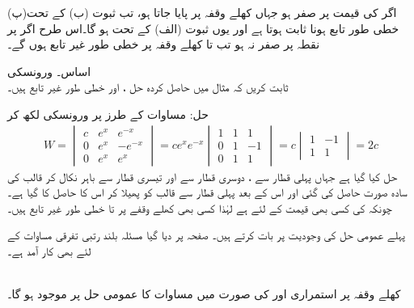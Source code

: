 (پ)\quad اگر  کی قیمت  پر صفر ہو جہاں  کھلے وقفہ  پر پایا جاتا ہو، تب ثبوت (ب) کے تحت خطی طور تابع ہونا ثابت ہوتا ہے اور یوں ثبوت (الف) کے تحت  ہو گا۔اس طرح اگر  پر نقطہ  پر  صفر نہ ہو تب  تا  کھلے وقفہ  پر خطی طور غیر تابع ہوں گے۔

 \quad اساس۔ ورونسکی\\
ثابت کریں کہ مثال  میں حاصل کردہ حل ،  اور  خطی طور غیر تابع ہیں۔

حل: مساوات  کے طرز پر  ورونسکی لکھ کر
\begin{align*}
W=
\begin{vmatrix}
c& e^x& e^{-x}\\
0& e^x & -e^{-x}\\
0&e^x&e^x
\end{vmatrix}
=c e^{x} e^{-x}
\begin{vmatrix}
1& 1& 1\\
0& 1 & -1\\
0&1&1
\end{vmatrix}=
c
\begin{vmatrix}
1& -1\\
1&1
\end{vmatrix}
=2c
\end{align*}
حل کیا گیا ہے جہاں پہلی قطار سے ، دوسری قطار سے  اور تیسری قطار سے  باہر نکال کر قالب کی سادہ صورت حاصل کی گئی اور اس کے بعد پہلی قطار سے قالب کو پھیلا کر اس کا  حاصل کا گیا ہے۔چونکہ  کی کسی بھی قیمت کے لئے   ہے لہٰذا کسی بھی کھلے وقفے پر  تا  خطی طور غیر تابع ہیں۔

پہلے عمومی حل کی وجودیت پر بات کرتے ہیں۔ صفحہ  پر دیا گیا مسئلہ  بلند رتبی تفرقی مساوات کے لئے بھی کار آمد ہے۔

\\
کھلے وقفہ  پر استمراری  اور  کی صورت میں مساوات  کا عمومی حل  پر موجود ہو گا۔

